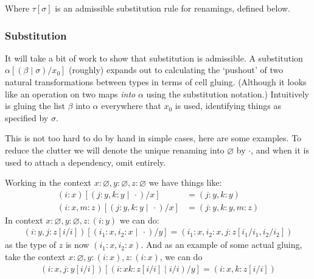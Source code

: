 \documentclass[10pt]{article}
\let\emptyset\varnothing
\begin{document}
Where $\tau[\sigma]$ is an admissible substitution rule for renamings, defined below.

\subsubsection{Substitution}

It will take a bit of work to show that substitution is admissible. A substitution $\alpha[(\beta \mid \sigma) / x_0]$ (roughly) expands out to calculating the `pushout' of two natural transformations between types in terms of cell gluing. (Although it looks like an operation on two maps \emph{into} $\alpha$ using the substitution notation.) Intuitively is gluing the list $\beta$ into $\alpha$ everywhere that $x_0$ is used, identifying things as specified by $\sigma$.

This is not too hard to do by hand in simple cases, here are some examples. To reduce the clutter we will denote the unique renaming into $\emptyset$ by $\cdot$, and when it is used to attach a dependency, omit entirely.

Working in the context $x : \emptyset, y : \emptyset, z : \emptyset$ we have things like:
\begin{align*}
(i : x)[(j : y, k : y \mid\, \cdot)/x] &= (j : y, k : y) \\
(i : x, m : z)[(j : y, k : y \mid\, \cdot)/x] &= (j : y, k : y, m : z)
\end{align*}
In context $x : \emptyset, y : \emptyset, z : (i : y)$ we can do:
\begin{align*}
(i : y, j : z[i/i])[(i_1 : x, i_2 : x \mid\, \cdot)/ y] = (i_1 : x, i_2 : x, j : z[i_1/i_1, i_2/i_2])
\end{align*}
as the type of $z$ is now $(i_1 : x, i_2 : x)$. And as an example of some actual gluing, take the context $x : \emptyset, y : (i : x), z : (i : x)$, we can do
\begin{align*}
(i : x, j : y[i/i])[(i : x k : z[i/i] \mid i/i ) / y] = (i : x, k : z[i/i])
\end{align*}
\end{document}
